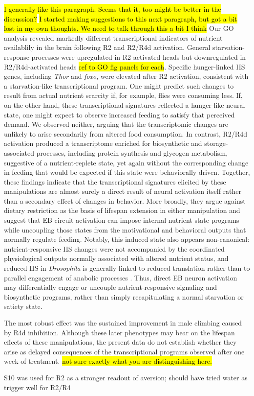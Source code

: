 \hl{I generally like this paragraph.  Seems that it, too might be better in the discussion?}
\hl{I started making suggestions to this next paragraph, but got a bit lost in my own thoughts.  We need to talk through this a bit I think}
Our GO analysis revealed markedly different transcriptional indicators of nutrient availablily in the brain following R2 and R2/R4d activation. 
General starvation-response processes were upregulated in R2-activated heads but downregulated in R2/R4d-activated heads \hl{ref to GO fig panels for each}. 
Specific hunger-linked IIS genes, including \textit{Thor} and \textit{foxo}, were elevated after R2 activation, consistent with a starvation-like transcriptional program. 
One might predict such changes to result from actual nutrient scarcity if, for example, flies were consuming less. 
If, on the other hand, these transcriptional signatures reflected a hunger-like neural state, one might expect to observe increased feeding to satisfy that perceived demand. 
We observed neither, arguing that the transcriptomic changes are unlikely to arise secondarily from altered food consumption. 
In contrast, R2/R4d activation produced a transcriptome enriched for biosynthetic and storage-associated processes, including protein synthesis and glycogen metabolism, suggestive of a nutrient-replete state, yet again without the corresponding change in feeding that would be expected if this state were behaviorally driven. 
Together, these findings indicate that the transcriptional signatures elicited by these manipulations are almost surely a direct result of neural activation itself rather than a secondary effect of changes in behavior. 
More broadly, they argue against dietary restriction as the basis of lifespan extension in either manipulation and suggest that EB circuit activation can impose internal nutrient-state programs while uncoupling those states from the motivational and behavioral outputs that normally regulate feeding. 
Notably, this induced state also appears non-canonical: nutrient-responsive IIS changes were not accompanied by the coordinated physiological outputs normally associated with altered nutrient status, and reduced IIS in \textit{Drosophila} is generally linked to reduced translation rather than to parallel engagement of anabolic processes \cite{essers2016}. 
Thus, direct EB neuron activation may differentially engage or uncouple nutrient-responsive signaling and biosynthetic programs, rather than simply recapitulating a normal starvation or satiety state.

The most robust effect was the sustained improvement in male climbing caused by R4d inhibition. 
Although these later phenotypes may bear on the lifespan effects of these manipulations, the present data do not establish whether they arise as delayed consequences of the transcriptional programs observed after one week of treatment.
\hl{not sure exactly what you are distinguishing here.}

S10 was used for R2 as a stronger readout of aversion; should have tried water as trigger well for R2/R4